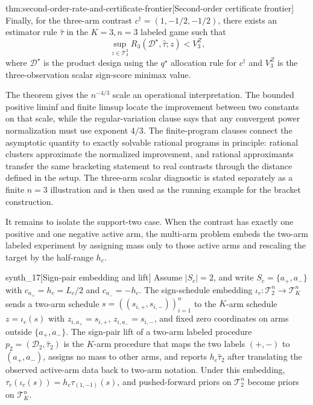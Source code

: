 \begin{theoremv}{thm:second-order-rate-and-certificate-frontier}[Second-order certificate frontier]
Finally, for the three-arm contrast \(c^\dagger=(1,-1/2,-1/2)\), there exists an estimator rule \(\widehat\tau\) in the \(K=3,n=3\) labeled game such that
\[
\sup_{z\in\mathcal T_3^3}
R_3(\mathcal D^\star,\widehat\tau;z)
<
V_3^Z,
\]
where \(\mathcal D^\star\) is the product design using the \(q^\star\) allocation rule for \(c^\dagger\) and \(V_3^Z\) is the three-observation scalar sign-score minimax value.
\end{theoremv}

The theorem gives the \(n^{-4/3}\) scale an operational interpretation. The bounded positive liminf and finite limsup locate the improvement between two constants on that scale, while the regular-variation clause says that any convergent power normalization must use exponent \(4/3\). The finite-program clauses connect the asymptotic quantity to exactly solvable rational programs in principle: rational clusters approximate the normalized improvement, and rational approximants transfer the same bracketing statement to real contrasts through the distance defined in the setup. The three-arm scalar diagnostic is stated separately as a finite \(n=3\) illustration and is then used as the running example for the bracket construction.

It remains to isolate the support-two case. When the contrast has exactly one positive and one negative active arm, the multi-arm problem embeds the two-arm labeled experiment by assigning mass only to those active arms and rescaling the target by the half-range \(h_c\).

\begin{definitionv}{synth_17}[Sign-pair embedding and lift]
Assume \(|S_c|=2\), and write \(S_c=\{a_+,a_-\}\) with \(c_{a_+}=h_c=L_c/2\) and \(c_{a_-}=-h_c\). The sign-schedule embedding \(\iota_c:\mathcal T_2^n\to\mathcal T_K^n\) sends a two-arm schedule \(s=((s_{i,+},s_{i,-}))_{i=1}^n\) to the \(K\)-arm schedule \(z=\iota_c(s)\) with \(z_{i,a_+}=s_{i,+}\), \(z_{i,a_-}=s_{i,-}\), and fixed zero coordinates on arms outside \(\{a_+,a_-\}\). The sign-pair lift of a two-arm labeled procedure \(p_2=(\mathcal D_2,\widehat\tau_2)\) is the \(K\)-arm procedure that maps the two labels \((+, -)\) to \((a_+,a_-)\), assigns no mass to other arms, and reports \(h_c\widehat\tau_2\) after translating the observed active-arm data back to two-arm notation. Under this embedding, \(\tau_c(\iota_c(s))=h_c\tau_{(1,-1)}(s)\), and pushed-forward priors on \(\mathcal T_2^n\) become priors on \(\mathcal T_K^n\).
\end{definitionv}

